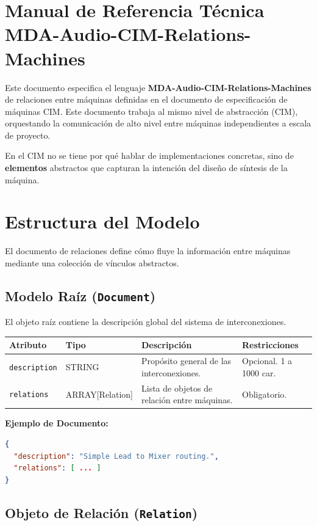 \section{Manual de Referencia Técnica MDA-Audio-CIM-Relations-Machines}

Este documento especifica el lenguaje \textbf{MDA-Audio-CIM-Relations-Machines} de relaciones entre máquinas definidas en el documento de especificación de máquinas CIM. Este documento trabaja al mismo nivel de abstracción (CIM), orquestando la comunicación de alto nivel entre máquinas independientes a escala de proyecto.

En el CIM no se tiene por qué hablar de implementaciones concretas, sino de \textbf{elementos} abstractos que capturan la intención del diseño de síntesis de la máquina.

\section{Estructura del Modelo}

El documento de relaciones define cómo fluye la información entre máquinas mediante una colección de vínculos abstractos.

\subsection{Modelo Raíz (\texttt{Document})}

El objeto raíz contiene la descripción global del sistema de interconexiones.

\begin{table}[H]
\centering
\small
\begin{tabular}{@{}llp{5cm}l@{}}
\toprule
Atributo & Tipo & Descripción & Restricciones \\ \midrule
\texttt{description} & STRING & Propósito general de las interconexiones. & Opcional. 1 a 1000 car. \\
\texttt{relations} & ARRAY[Relation] & Lista de objetos de relación entre máquinas. & Obligatorio. \\ \bottomrule
\end{tabular}
\end{table}

\textbf{Ejemplo de Documento:}
\begin{lstlisting}[language=json]
{
  "description": "Simple Lead to Mixer routing.",
  "relations": [ ... ]
}
\end{lstlisting}

\subsection{Objeto de Relación (\texttt{Relation})}


